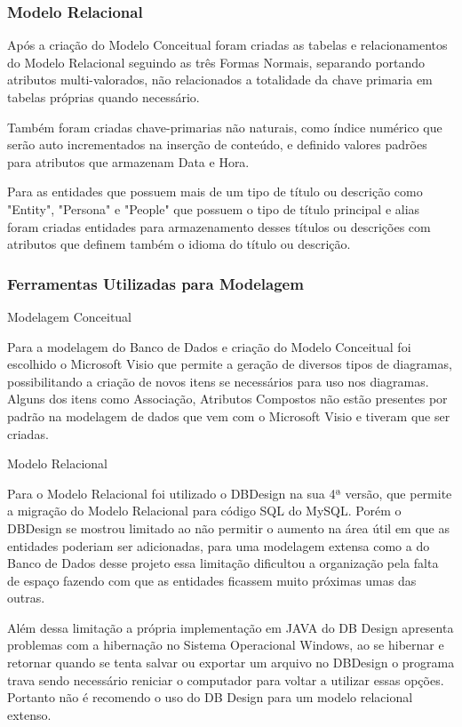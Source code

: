 \documentclass[12pt]{article}
\begin{document}
\subsubsection{Modelo Relacional}

Após a criação do Modelo Conceitual foram criadas as tabelas e relacionamentos do Modelo Relacional seguindo as três Formas Normais, separando portando atributos multi-valorados, não relacionados a totalidade da chave primaria em tabelas próprias quando necessário.

Também foram criadas chave-primarias não naturais, como índice numérico que serão auto incrementados na inserção de conteúdo, e definido valores padrões para atributos que armazenam Data e Hora.

Para as entidades que possuem mais de um tipo de título ou descrição como "Entity", "Persona" e "People" que possuem o tipo de título principal e alias foram criadas entidades para armazenamento desses títulos ou descrições com atributos que definem também o idioma do título ou descrição.


\subsubsection{Ferramentas Utilizadas para Modelagem}

Modelagem Conceitual

Para a modelagem do Banco de Dados e criação do Modelo Conceitual foi escolhido o Microsoft Visio que permite a geração de diversos tipos de diagramas, possibilitando a criação de novos itens se necessários para uso nos diagramas. Alguns dos itens como Associação, Atributos Compostos não estão presentes por padrão na modelagem de dados que vem com o Microsoft Visio e tiveram que ser criadas.

Modelo Relacional

Para o Modelo Relacional foi utilizado o DBDesign na sua 4ª versão, que permite a migração do Modelo Relacional para código SQL do MySQL. Porém o DBDesign se mostrou limitado ao não permitir o aumento na área útil em que as entidades poderiam ser adicionadas, para uma modelagem extensa como a do Banco de Dados desse projeto essa limitação dificultou a organização pela falta de espaço fazendo com que as entidades ficassem muito próximas umas das outras. 

Além dessa limitação a própria implementação em JAVA do DB Design apresenta problemas com a hibernação no Sistema Operacional Windows, ao se hibernar e retornar quando se tenta salvar ou exportar um arquivo no DBDesign o programa trava sendo necessário reniciar o computador para voltar a utilizar essas opções. Portanto não é recomendo o uso do DB Design para um modelo relacional extenso. 
\end{document}
